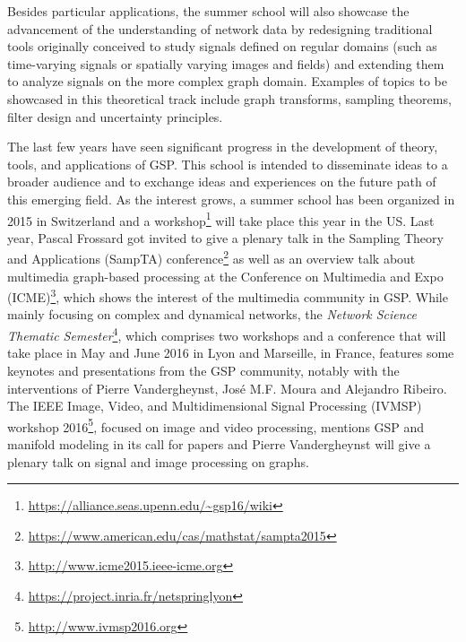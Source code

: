 \documentclass[a4paper]{scrartcl}
\begin{document}
Besides particular applications, the summer school will also showcase the
advancement of the understanding of network data by redesigning traditional
tools originally conceived to study signals defined on regular domains (such as
time-varying signals or spatially varying images and fields) and extending them
to analyze signals on the more complex graph domain. Examples of topics to be
showcased in this theoretical track include graph transforms, sampling theorems,
filter design and uncertainty principles.

The last few years have seen significant progress in the development of theory,
tools, and applications of GSP. This school is intended to disseminate ideas to
a broader audience and to exchange ideas and experiences on the future path of
this emerging field. As the interest grows, a summer school has been organized
in 2015 in Switzerland and a
workshop\footnote{\url{https://alliance.seas.upenn.edu/~gsp16/wiki}} will take
place this year in the US. Last year, Pascal Frossard got invited to give a
plenary talk in the Sampling Theory and Applications (SampTA)
conference\footnote{\url{https://www.american.edu/cas/mathstat/sampta2015}} as
well as an overview talk about multimedia graph-based processing at the
Conference on Multimedia and Expo
(ICME)\footnote{\url{http://www.icme2015.ieee-icme.org}}, which shows the
interest of the multimedia community in GSP. While mainly focusing on complex
and dynamical networks, the \textit{Network Science Thematic
Semester}\footnote{\url{https://project.inria.fr/netspringlyon}}, which
comprises two workshops and a conference that will take place in May and June
2016 in Lyon and Marseille, in France, features some keynotes and presentations
from the GSP community, notably with the interventions of Pierre Vandergheynst,
José M.F. Moura and Alejandro Ribeiro. The IEEE Image, Video, and
Multidimensional Signal Processing (IVMSP) workshop
2016\footnote{\url{http://www.ivmsp2016.org}}, focused on image and video
processing, mentions GSP and manifold modeling in its call for papers and
Pierre Vandergheynst will give a plenary talk on signal and image processing on
graphs.
\end{document}
